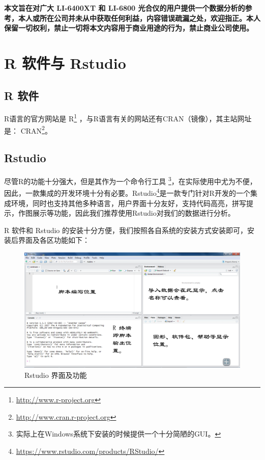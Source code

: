 \documentclass[
]{krantz}
\renewcommand{\href}[2]{#2\footnote{\url{#1}}}
\begin{document}
\textbf{本文旨在对广大 LI-6400XT 和 LI-6800 光合仪的用户提供一个数据分析的参考，本人或所在公司并未从中获取任何利益，内容错误疏漏之处，欢迎指正。本人保留一切权利，禁止一切将本文内容用于商业用途的行为，禁止商业公司使用。}

\cleardoublepage

\mainmatter

\hypertarget{intro}{%
\chapter{R 软件与 Rstudio}\label{intro}}

\hypertarget{rsoft}{%
\section{R 软件}\label{rsoft}}

R语言的官方网站是 \href{http://www.r-project.org}{R} ，与R语言有关的网站还有CRAN（镜像），其主站网址是： \href{http://www.cran.r-project.org}{CRAN}。

\hypertarget{rstudiosoft}{%
\section{Rstudio}\label{rstudiosoft}}

尽管R的功能十分强大，但是其作为一个命令行工具 \footnote{实际上在Windows系统下安装的时候提供一个十分简陋的GUI。}，在实际使用中尤为不便，因此，一款集成的开发环境十分有必要。\href{https://www.rstudio.com/products/RStudio/}{Rstudio}是一款专门针对R开发的一个集成环境，同时也支持其他多种语言，用户界面十分友好，支持代码高亮，拼写提示，作图展示等功能，因此我们推荐使用Rstudio对我们的数据进行分析。

R 软件和 Rstudio 的安装十分方便，我们按照各自系统的安装方式安装即可，安装后界面及各区功能如下：

\begin{figure}
\includegraphics[width=4.55in]{images/rstudio} \caption{Rstudio 界面及功能}\label{fig:unnamed-chunk-2}
\end{figure}
\end{document}
